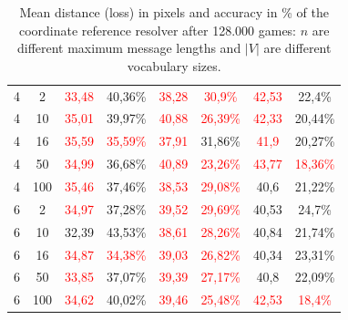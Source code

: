 \begin{table}[ht]
\begin{tabular}{cc|cc|cc|cc}
        {4}                           & {2}     & \textcolor{red}{33,48}              & {40,36\%}                           & \textcolor{red}{38,28}                   & \textcolor{red}{30,9\%}  & \textcolor{red}{42,53} & {22,4\%}                 \\
        {4}                           & {10}    & \textcolor{red}{35,01}              & {39,97\%}                           & \textcolor{red}{40,88}                   & \textcolor{red}{26,39\%} & \textcolor{red}{42,33} & {20,44\%}                \\
        {4}                           & {16}    & \textcolor{red}{35,59}              & \textcolor{red}{35,59\%}            & \textcolor{red}{37,91}                   & {31,86\%}                & \textcolor{red}{41,9}  & {20,27\%}                \\
        {4}                           & {50}    & \textcolor{red}{34,99}              & {36,68\%}                           & \textcolor{red}{40,89}                   & \textcolor{red}{23,26\%} & \textcolor{red}{43,77} & \textcolor{red}{18,36\%} \\
        {4}                           & {100}   & \textcolor{red}{35,46}              & {37,46\%}                           & \textcolor{red}{38,53}                   & \textcolor{red}{29,08\%} & {40,6}                 & {21,22\%}                \\
        {6}                           & {2}     & \textcolor{red}{34,97}              & {37,28\%}                           & \textcolor{red}{39,52}                   & \textcolor{red}{29,69\%} & {40,53}                & {24,7\%}                 \\
        {6}                           & {10}    & {32,39}                             & {43,53\%}                           & \textcolor{red}{38,61}                   & \textcolor{red}{28,26\%} & {40,84}                & {21,74\%}                \\
        {6}                           & {16}    & \textcolor{red}{34,87}              & \textcolor{red}{34,38\%}            & \textcolor{red}{39,03}                   & \textcolor{red}{26,82\%} & {40,34}                & {23,31\%}                \\
        {6}                           & {50}    & \textcolor{red}{33,85}              & {37,07\%}                           & \textcolor{red}{39,39}                   & \textcolor{red}{27,17\%} & {40,8}                 & {22,09\%}                \\
        {6}                           & {100}   & \textcolor{red}{34,62}              & {40,02\%}                           & \textcolor{red}{39,46}                   & \textcolor{red}{25,48\%} & \textcolor{red}{42,53} & \textcolor{red}{18,4\%}  \\
        \bottomrule
    \end{tabular}
    \caption{Mean distance (loss) in pixels and accuracy in \% of the coordinate reference resolver after 128.000 games: $n$ are different maximum message lengths and $|V|$ are different vocabulary sizes.}
    \label{tab:results:coordinate-reference-resolver-game}
\end{table}


